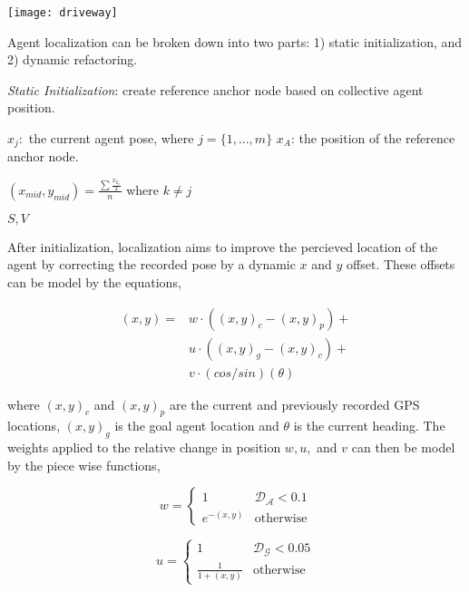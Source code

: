 \texttt{[image: driveway]}

Agent localization can be broken down into two parts: 1) static initialization, and 2) dynamic refactoring.

\begin{algorithm} 
	\caption{\textit{Static Initialization}: create reference anchor node based on collective agent position.}
	\label{alg:init}
	\begin{algorithmic}[1]
		\renewcommand{\algorithmicrequire}{\textbf{Input:}}
		\renewcommand{\algorithmicensure}{\textbf{Output:}}
		\REQUIRE $x_j:$ the current agent pose, where $j = \{1, ... ,m\}$
		\ENSURE  $x_A$: the position of the reference anchor node.
		
				\STATE $(x_{mid}, y_{mid}) = \frac{\sum \frac{x_{k_c}}{2}}{n}$ where $k \neq j$
			\ENDFOR
		\ENDFOR
		
		\RETURN $S, V$
	\end{algorithmic}
\end{algorithm}

After initialization, localization aims to improve the percieved location of the agent by correcting the recorded pose by a dynamic $x$ and $y$ offset. These offsets can be model by the equations,

\begin{equation}
	\begin{aligned}
		(x, y) = & w \cdot ((x, y)_c - (x, y)_p) + \\
		& u \cdot ((x, y)_g - (x, y)_c) + \\
		& v \cdot (cos/sin)(\theta) 
	\end{aligned}	
\end{equation}

where $(x, y)_c$ and $(x, y)_p$ are the current and previously recorded GPS locations, $(x, y)_g$ is the goal agent location and $\theta$ is the current heading. The weights applied to the relative change in position $w, u,$ and $v$ can then be model by the piece wise functions,

\begin{equation}
	w = 
	\begin{cases}
		1 & \mathcal{D_A} < 0.1 \\
		e^{-(x, y)} & \text{otherwise}
	\end{cases}
\end{equation}

\begin{equation}
	u = 
	\begin{cases}
		1 & \mathcal{D_G} < 0.05 \\
		\frac{1}{1 + (x, y)} & \text{otherwise}
	\end{cases}
\end{equation}

